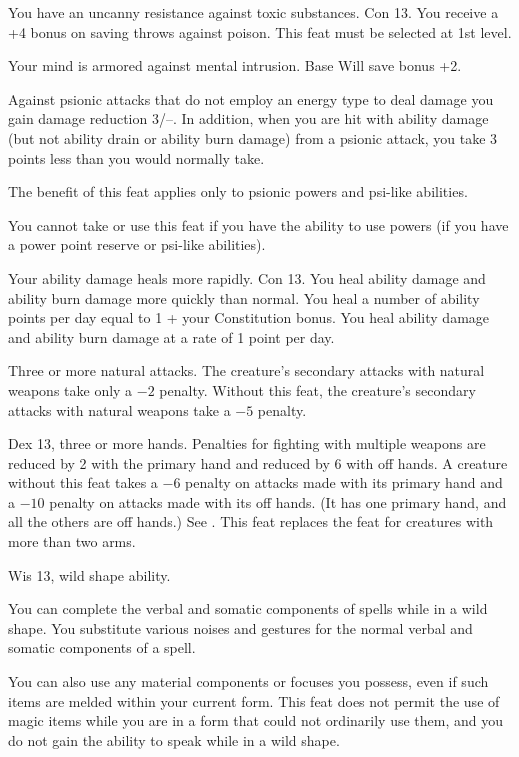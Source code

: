 {You have an uncanny resistance against toxic substances.}
{Con 13.}
{You receive a +4 bonus on saving throws against poison.}{}
{This feat must be selected at 1st level.}

{Your mind is armored against mental intrusion.}
{Base Will save bonus +2.}
{Against psionic attacks that do not employ an energy type to deal damage you gain damage reduction 3/--. In addition, when you are hit with ability damage (but not ability drain or ability burn damage) from a psionic attack, you take 3 points less than you would normally take.

The benefit of this feat applies only to psionic powers and psi-like abilities. %
}{}
{You cannot take or use this feat if you have the ability to use powers (if you have a power point reserve or psi-like abilities).}

{Your ability damage heals more rapidly.}
{Con 13.}
{You heal ability damage and ability burn damage more quickly than normal. You heal a number of ability points per day equal to 1 + your Constitution bonus.}
{You heal ability damage and ability burn damage at a rate of 1 point per day.}{}

{}
{Three or more natural attacks.}
{The creature's secondary attacks with natural weapons take only a $-2$ penalty.}
{Without this feat, the creature's secondary attacks with natural weapons take a $-5$ penalty.}
{}

{}
{Dex 13, three or more hands.}
{Penalties for fighting with multiple weapons are reduced by 2 with the primary hand and reduced by 6 with off hands.}
{A creature without this feat takes a $-6$ penalty on attacks made with its primary hand and a $-10$ penalty on attacks made with its off hands. (It has one primary hand, and all the others are off hands.) See .}
{This feat replaces the  feat for creatures with more than two arms.}

{Wis 13, wild shape ability.}
{You can complete the verbal and somatic components of spells while in a wild shape. You substitute various noises and gestures for the normal verbal and somatic components of a spell.

You can also use any material components or focuses you possess, even if such items are melded within your current form. This feat does not permit the use of magic items while you are in a form that could not ordinarily use them, and you do not gain the ability to speak while in a wild shape.}

